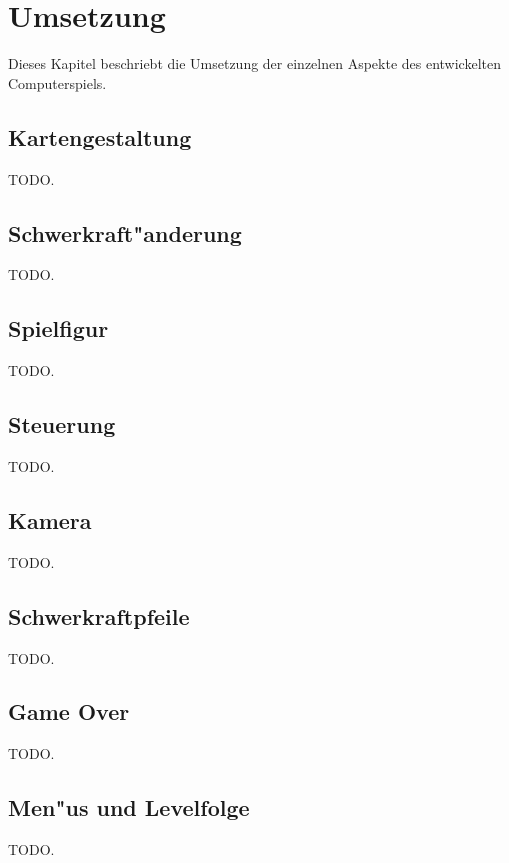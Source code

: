 \section{Umsetzung}
\label{sec:implementation}
%
Dieses Kapitel beschriebt die Umsetzung der einzelnen Aspekte des
entwickelten Computerspiels.
%
\subsection{Kartengestaltung}
\label{sec:implementation/maps}
%
TODO.
%
\subsection{Schwerkraft"anderung}
\label{sec:implementation/gravity}
%
TODO.
%
\subsection{Spielfigur}
\label{sec:implementation/avatar}
%
TODO.
%
\subsection{Steuerung}
\label{sec:implementation/controls}
%
TODO.
%
\subsection{Kamera}
\label{sec:implementation/camera}
%
TODO.
%
\subsection{Schwerkraftpfeile}
\label{sec:implementation/arrows}
%
TODO.
%
\subsection{Game Over}
\label{sec:implementation/gameover}
%
TODO.
%
\subsection{Men"us und Levelfolge}
\label{sec:implementation/menus}
%
TODO.
